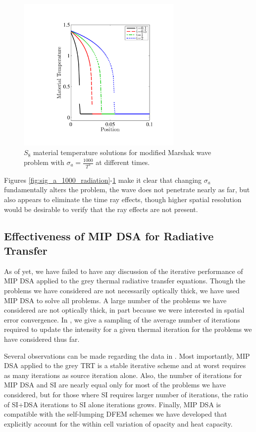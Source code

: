 \begin{figure}[!hbp]
\centering
\includegraphics[width=8cm,trim=1in  0.6in 1.0in 0.75in,clip=true]{chapter6_grey_radtran/Dissertation_Data/P1_S8_Time_Ray_Effects_Temperature_Cv1_SigA1000.pdf}
\caption{$S_{8}$ material temperature solutions for modified Marshak wave problem with $\sigma_a = \frac{1000}{T^3}$ at different times.}
\label{fig:sig_a_1000_temperature}
\end{figure}
Figures \ref{fig:sig_a_1000_radiation}-\ref{fig:sig_a_1000_temperature} make it clear that changing $\sigma_a$ fundamentally alters the problem, the wave does not penetrate nearly as far, but also appears to eliminate the time ray effects, though higher spatial resolution would be desirable to verify that the ray effects are not present.

\subsection{Effectiveness of MIP DSA for Radiative Transfer}

As of yet, we have failed to have any discussion of the iterative performance of MIP DSA applied to the grey thermal radiative transfer equations.
Though the problems we have considered are not necessarily optically thick, we have used MIP DSA to solve all problems.
A large number of the problems we have considered are not optically thick, in part because we were interested in spatial error convergence.
In , we give a sampling of the average number of iterations required to update the intensity for a given thermal iteration for the problems we have considered thus far.

Several observations can be made regarding the data in .  
Most importantly, MIP DSA applied to the grey TRT is a stable iterative scheme and at worst requires as many iterations as source iteration alone.
Also, the number of iterations for MIP DSA and SI are nearly equal only for most of the problems we have considered, but for those where SI requires larger number of iterations, the ratio of SI+DSA iterations to SI alone iterations grows.
Finally, MIP DSA is compatible with the self-lumping DFEM schemes we have developed that explicitly account for the within cell variation of opacity and heat capacity.

